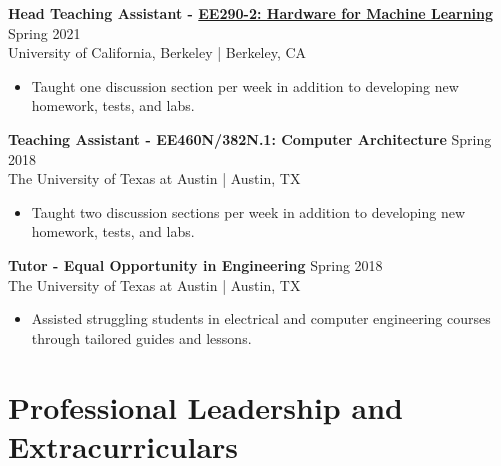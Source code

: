 \documentclass[line]{res}
\begin{document}
\begin{resume}
\textbf{Head Teaching Assistant - \href{https://inst.eecs.berkeley.edu/~ee290-2/sp21}{EE290-2: Hardware for Machine Learning}} \hfill Spring 2021
\\
University of California, Berkeley | Berkeley, CA
\\
\vspace{-3mm}
\begin{itemize}
\item Taught one discussion section per week in addition to developing new homework, tests, and labs.
\end{itemize}

\textbf{Teaching Assistant - EE460N/382N.1: Computer Architecture} \hfill Spring 2018
\\
The University of Texas at Austin | Austin, TX
\\
\vspace{-3mm}
\begin{itemize}
\item Taught two discussion sections per week in addition to developing new homework, tests, and labs.
\end{itemize}

\textbf{Tutor - Equal Opportunity in Engineering} \hfill Spring 2018
\\
The University of Texas at Austin | Austin, TX
\\
\vspace{-3mm}
\begin{itemize}
\item Assisted struggling students in electrical and computer engineering courses through tailored guides and lessons.
\end{itemize}


\section{\Large{Professional Leadership and Extracurriculars}}
\label{sec:profleadershipmembership}
\vspace{2mm}


\end{resume}
\end{document}
